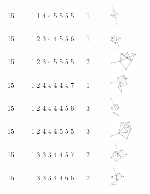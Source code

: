 \begin{table}[h!]
\begin{tabular}{m{0.15\linewidth} m{0.35\linewidth} m{0.15\linewidth} m{0.25\linewidth}}
15 & 1 1 4 4 5 5 5 5 & 1 & \includegraphics[height=1cm]{15-universal-graphs/img/degree-sequences-example-graphs/graph-4-8-95}\\
15 & 1 2 3 4 4 5 5 6 & 1 & \includegraphics[height=1cm]{15-universal-graphs/img/degree-sequences-example-graphs/graph-4-8-96}\\
15 & 1 2 3 4 5 5 5 5 & 2 & \includegraphics[height=1cm]{15-universal-graphs/img/degree-sequences-example-graphs/graph-4-8-97}\\
15 & 1 2 4 4 4 4 4 7 & 1 & \includegraphics[height=1cm]{15-universal-graphs/img/degree-sequences-example-graphs/graph-4-8-98}\\
15 & 1 2 4 4 4 4 5 6 & 3 & \includegraphics[height=1cm]{15-universal-graphs/img/degree-sequences-example-graphs/graph-4-8-99}\\
15 & 1 2 4 4 4 5 5 5 & 3 & \includegraphics[height=1cm]{15-universal-graphs/img/degree-sequences-example-graphs/graph-4-8-100}\\
15 & 1 3 3 3 4 4 5 7 & 2 & \includegraphics[height=1cm]{15-universal-graphs/img/degree-sequences-example-graphs/graph-4-8-101}\\
15 & 1 3 3 3 4 4 6 6 & 2 & \includegraphics[height=1cm]{15-universal-graphs/img/degree-sequences-example-graphs/graph-4-8-102}\\

\end{tabular}
\end{table}
